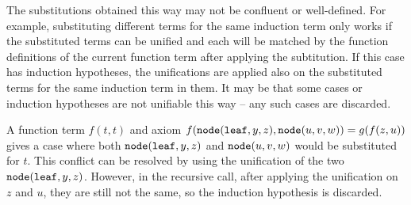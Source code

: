 The substitutions obtained this way may not be confluent or well-defined. For example, substituting different terms for the same induction term only works if the substituted terms can be unified and each will be matched by the function definitions of the current function term after applying the subtitution. If this case has induction hypotheses, the unifications are applied also on the substituted terms for the same induction term in them. It may be that some cases or induction hypotheses are not unifiable this way -- any such cases are discarded.

\begin{example}
	A function term $f(t,t)$ and axiom $f(\mathtt{node}(\mathtt{leaf},y,z),\mathtt{node}(u,v,w))=g(f(z,u))$ gives a case where both $\mathtt{node}(\mathtt{leaf},y,z)$ and $\mathtt{node}(u,v,w)$ would be substituted for $t$. This conflict can be resolved by using the unification of the two $\mathtt{node}(\mathtt{leaf},y,z)$. However, in the recursive call, after applying the unification on $z$ and $u$, they are still not the same, so the induction hypothesis is discarded.
\end{example}